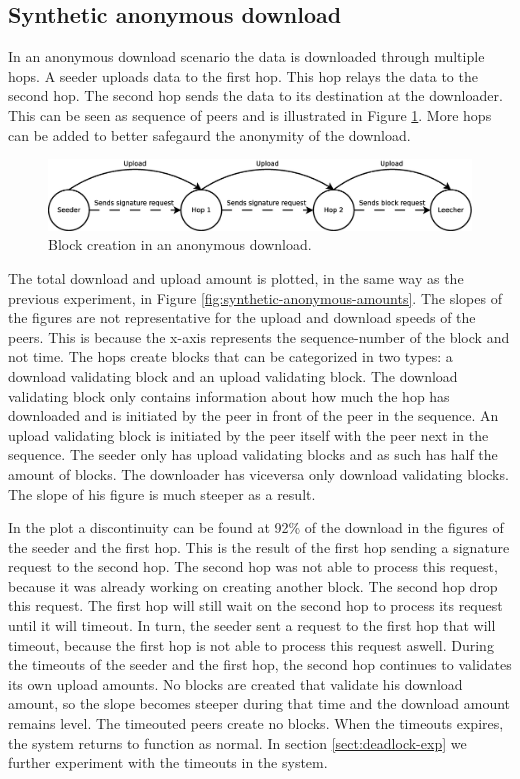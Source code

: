 \subsection{Synthetic anonymous download}
In an anonymous download scenario the data is downloaded through multiple hops.
A seeder uploads data to the first hop.
This hop relays the data to the second hop.
The second hop sends the data to its destination at the downloader.
This can be seen as sequence of peers and is illustrated in Figure \ref{fig:seeder-hops-downloader}.
More hops can be added to better safegaurd the anonymity of the download.

\begin{figure}
	\centerline{\includegraphics[scale=0.3]{experimentation/anonymous/seeder-hops-downloader.eps}}
	\caption{Block creation in an anonymous download.}
	\label{fig:seeder-hops-downloader}
\end{figure}

The total download and upload amount is plotted, in the same way as the previous experiment,
in Figure \ref{fig:synthetic-anonymous-amounts}.
The slopes of the figures are not representative for the upload and download speeds of the peers.
This is because the x-axis represents the sequence-number of the block and not time.
The hops create blocks that can be categorized in two types:
a download validating block and an upload validating block.
The download validating block only contains information about how much the hop has downloaded
and is initiated by the peer in front of the peer in the sequence.
An upload validating block is initiated by the peer itself with the peer next in the sequence.
The seeder only has upload validating blocks and as such has half the amount of blocks.
The downloader has viceversa only download validating blocks.
The slope of his figure is much steeper as a result.

In the plot a discontinuity can be found at 92\% of the download in the figures of the seeder and the first hop.
This is the result of the first hop sending a signature request to the second hop.
The second hop was not able to process this request,
because it was already working on creating another block.
The second hop drop this request.
The first hop will still wait on the second hop to process its request until it will timeout.
In turn, the seeder sent a request to the first hop that will timeout,
because the first hop is not able to process this request aswell.
During the timeouts of the seeder and the first hop,
the second hop continues to validates its own upload amounts.
No blocks are created that validate his download amount,
so the slope becomes steeper during that time and the download amount remains level.
The timeouted peers create no blocks.
When the timeouts expires, the system returns to function as normal.
In section \ref{sect:deadlock-exp} we further experiment with the timeouts in the system.

